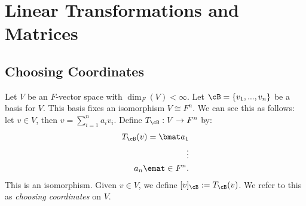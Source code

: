 \chapter{Linear Transformations and Matrices}\label{chapter:Linear Transformations and Matrices}

\vspace{12pt}
\section{Choosing Coordinates}\label{sec:Choosing Coordinates}
    \begin{example}
        Let $V$ be an $F$-vector space with $\dim_F(V) <\infty$. Let $\cB = \{v_1,...,v_n\}$ be a basis for $V$. This basis fixes an isomorphism $V \cong F^n$. We can see this as follows: let $v \in V$, then $v = \sum_{i = 1}^n a_i v_i$. Define $T_\cB :V \rightarrow F^n$ by:
            \begin{equation*}
            \begin{split}
                T_\cB(v) = \bmat a_1 \\ \vdots \\ a_n \emat \in F^n.
            \end{split}
            \end{equation*}
        This is an isomorphism. Given $v \in V$, we define $[v]_\cB := T_\cB(v)$. We refer to this as \textit{choosing coordinates} on $V$.
    \end{example}

